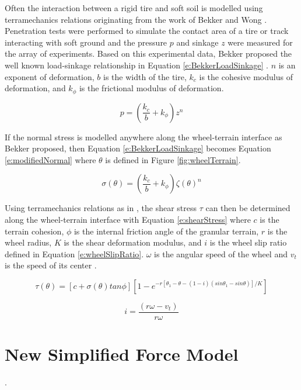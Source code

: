 \documentclass[12pt,onecolumn]{report}
\begin{document}
Often the interaction between a rigid tire and soft soil is modelled using terramechanics relations originating from the work of Bekker and Wong \cite{wong93}. Penetration tests were performed to simulate the contact area of a tire or track interacting with soft ground and the pressure $p$ and sinkage $z$ were measured for the array of experiments. Based on this experimental data, Bekker proposed the well known load-sinkage relationship in Equation \ref{e:BekkerLoadSinkage} \cite{wong93}. $n$ is an exponent of deformation, $b$ is the width of the tire, $k_c$ is the cohesive modulus of deformation, and $k_\phi$ is the frictional modulus of deformation.

\begin{equation}\label{e:BekkerLoadSinkage}
p = \left(\frac{k_c}{b} + k_\phi\right)z^n
\end{equation}

If the normal stress is modelled anywhere along the wheel-terrain interface as Bekker proposed, then Equation \ref{e:BekkerLoadSinkage} becomes Equation \ref{e:modifiedNormal} where $\theta$ is defined in Figure \ref{fig:wheelTerrain}.

\begin{equation}\label{e:modifiedNormal}
\sigma\left(\theta\right) = \left(\frac{k_c}{b} + k_\phi\right)\zeta\left(\theta\right)^n
\end{equation}

Using terramechanics relations as in \cite{wong93}, the shear stress $\tau$ can then be determined along the wheel-terrain interface with Equation \ref{e:shearStress} where $c$ is the terrain cohesion, $\phi$ is the internal friction angle of the granular terrain, $r$ is the wheel radius, $K$ is the shear deformation modulus, and $i$ is the wheel slip ratio defined in Equation \ref{e:wheelSlipRatio}. $\omega$ is the angular speed of the wheel and $v_t$ is the speed of its center \cite{Ghotbi2016}. 

\begin{equation}\label{e:shearStress}
\tau\left(\theta\right) = [c+\sigma\left(\theta\right)tan\phi][1 - e^{-r[\theta_1 - \theta - \left(1-i\right)\left(sin\theta_1 - sin\theta\right)]/K}]
\end{equation}

\begin{equation}\label{e:wheelSlipRatio}
i = \frac{\left(r\omega-v_t \right)}{r \omega}
\end{equation}

\section{New Simplified Force Model}\label{s:NewForce}. 
\end{document}
